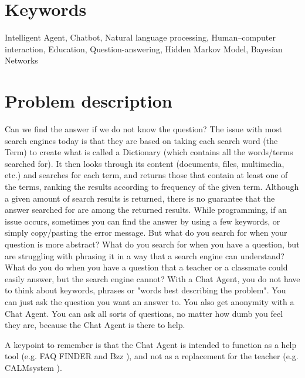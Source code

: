\section{Keywords}
\label{chapter2:keywords}
Intelligent Agent, Chatbot, Natural language processing, Human–computer interaction, Education, Question-answering, Hidden Markov Model, Bayesian Networks

\section{Problem description}
\label{chapter2:problem_description}
Can we find the answer if we do not know the question? The issue with most search engines today is that they are based on taking each search word (the Term) to create what is called 
a Dictionary (which contains all the words/terms searched for). It then looks through its content (documents, files, multimedia, etc.) and searches for each term, and returns those 
that contain at least one of the terms, ranking the results according to frequency of the given term. Although a given amount of search results is returned, there is no guarantee that 
the answer searched for are among the returned results. While programming, if an issue occurs, sometimes you can find the answer by using a few keywords, or simply copy/pasting the 
error message. But what do you search for when your question is more abstract? What do you search for when you have a question, but are struggling with phrasing it in a way that a 
search engine can understand? What do you do when you have a question that a teacher or a classmate could easily answer, but the search engine cannot?
\vspace{0.5em}\newline
With a Chat Agent, you do not have to think about keywords, phrases or "words best describing the problem". You can just ask the question you want an answer to. You also get anonymity 
with a Chat Agent. You can ask all sorts of questions, no matter how dumb you feel they are, because the Chat Agent is there to help. 

A keypoint to remember is that the Chat Agent is intended to function as a help tool (e.g. FAQ FINDER \cite{Burke1997} and Bzz \cite{Crutzen2011}), and not as a replacement for the 
teacher (e.g. CALMsystem \cite{Kerly2008}).

